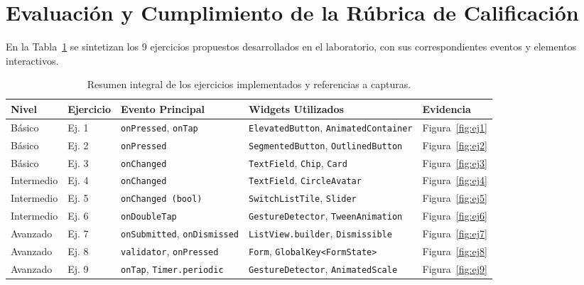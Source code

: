 \documentclass[12pt,a4paper]{article}
\begin{document}
  \section{Evaluación y Cumplimiento de la Rúbrica de Calificación}

  En la Tabla~\ref{tab:ejercicios_resumen} se sintetizan los 9 ejercicios propuestos desarrollados en el laboratorio, con sus correspondientes eventos y elementos interactivos.

  \begin{table}[htbp]
  \centering
  \small
  \caption{Resumen integral de los ejercicios implementados y referencias a capturas.}
  \label{tab:ejercicios_resumen}
  \begin{tabularx}{\textwidth}{>{\centering\arraybackslash}p{1.1cm} >{\raggedright\arraybackslash}p{1.8cm} >{\raggedright\arraybackslash}X >{\raggedright\arraybackslash}p{2.8cm} >{\centering\arraybackslash}p{2.2cm}}
  \toprule
  \textbf{Nivel} & \textbf{Ejercicio} & \textbf{Evento Principal} & \textbf{Widgets Utilizados} & \textbf{Evidencia} \\
  \midrule
  Básico & Ej. 1 & \texttt{onPressed}, \texttt{onTap} & \texttt{ElevatedButton}, \texttt{AnimatedContainer} & Figura~\ref{fig:ej1} \\
  Básico & Ej. 2 & \texttt{onPressed} & \texttt{SegmentedButton}, \texttt{OutlinedButton} & Figura~\ref{fig:ej2} \\
  Básico & Ej. 3 & \texttt{onChanged} & \texttt{TextField}, \texttt{Chip}, \texttt{Card} & Figura~\ref{fig:ej3} \\
  \midrule
  Intermedio & Ej. 4 & \texttt{onChanged} & \texttt{TextField}, \texttt{CircleAvatar} & Figura~\ref{fig:ej4} \\
  Intermedio & Ej. 5 & \texttt{onChanged (bool)} & \texttt{SwitchListTile}, \texttt{Slider} & Figura~\ref{fig:ej5} \\
  Intermedio & Ej. 6 & \texttt{onDoubleTap} & \texttt{GestureDetector}, \texttt{TweenAnimation} & Figura~\ref{fig:ej6} \\
  \midrule
  Avanzado & Ej. 7 & \texttt{onSubmitted}, \texttt{onDismissed} & \texttt{ListView.builder}, \texttt{Dismissible} & Figura~\ref{fig:ej7} \\
  Avanzado & Ej. 8 & \texttt{validator}, \texttt{onPressed} & \texttt{Form}, \texttt{GlobalKey<FormState>} & Figura~\ref{fig:ej8} \\
  Avanzado & Ej. 9 & \texttt{onTap}, \texttt{Timer.periodic} & \texttt{GestureDetector}, \texttt{AnimatedScale} & Figura~\ref{fig:ej9} \\
  \bottomrule
  \end{tabularx}
  \end{table}
\end{document}
